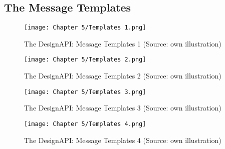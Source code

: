 \newpage
\subsection{The Message Templates}
\begin{figure}[H]
    \centering
    \texttt{[image: Chapter 5/Templates 1.png]}
    \caption{The DesignAPI: Message Templates 1 (Source: own illustration)}
\end{figure}

\begin{figure}[H]
    \centering
    \texttt{[image: Chapter 5/Templates 2.png]}
    \caption{The DesignAPI: Message Templates 2 (Source: own illustration)}
\end{figure}

\begin{figure}[H]
    \centering
    \texttt{[image: Chapter 5/Templates 3.png]}
    \caption{The DesignAPI: Message Templates 3 (Source: own illustration)}
\end{figure}

\begin{figure}[H]
    \centering
    \texttt{[image: Chapter 5/Templates 4.png]}
    \caption{The DesignAPI: Message Templates 4 (Source: own illustration)}
\end{figure}